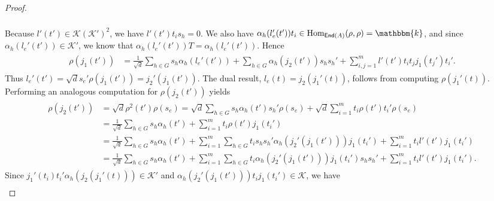 \begin{proof}
\begin{align*}
\begin{split}
\end{split}
\end{align*}
\noindent Because $l'(t') \in \mathcal{K}(\mathcal{K}')^2$, we have $l'(t')t_is_h = 0$. We also have $\alpha_h(l_e'(t'))t_i \in \homset_{\textcat{End}(A)}(\rho, \rho) = \mathbbm{k}$, and since $\alpha_h(l_e'(t')) \in \mathcal{K}'$, we know that $\alpha_h(l_e'(t'))T = \alpha_h(l_e'(t'))$. Hence
\begin{align*}
\begin{split}
\rho(j_1(t')) &= \frac{1}{\sqrt{d}}\sum_{h \in G} s_h\alpha_h(l_e'(t')) + \sum_{h \in G} \alpha_h(j_2(t'))s_hs_h' + \sum_{i,j=1}^m l'(t')t_it_j j_1(t_j')t_i'.
\end{split}
\end{align*}
\noindent Thus $l_e'(t') = \sqrt{d}s_e'\rho(j_1(t')) = j_2'(j_1(t'))$. The dual result, $l_e(t) = j_2(j_1'(t))$, follows from computing $\rho(j_1'(t))$. Performing an analogous computation for $\rho(j_2(t'))$ yields
\begin{align*}
\begin{split}
\rho(j_2(t')) &= \sqrt{d}\rho^2(t')\rho(s_e) = \sqrt{d}\sum_{h \in G}s_h\alpha_h(t')s_h'\rho(s_e) + \sqrt{d}\sum_{i=1}^m t_i\rho(t')t_i'\rho(s_e)\\
&= \frac{1}{\sqrt{d}}\sum_{h \in G}s_h\alpha_h(t') + \sum_{i=1}^m t_i\rho(t') j_1(t_i')\\
&= \frac{1}{\sqrt{d}}\sum_{h \in G}s_h\alpha_h(t') + \sum_{i=1}^m\sum_{h \in G} t_i s_hs_h'\alpha_h(j_2'(j_1(t')))j_1(t_i') + \sum_{i=1}^m t_i l'(t') j_1(t_i')\\
&= \frac{1}{\sqrt{d}}\sum_{h \in G}s_h\alpha_h(t') + \sum_{i=1}^m\sum_{h \in G} t_i\alpha_h(j_2'(j_1(t')))j_1(t_i') s_hs_h' + \sum_{i=1}^m t_i l'(t') j_1(t_i').
\end{split}
\end{align*}
\noindent Since $j_1'(t_i)t_i'\alpha_h(j_2(j_1'(t))) \in \mathcal{K}'$ and $\alpha_h(j_2'(j_1(t')))t_ij_1(t_i') \in \mathcal{K}$, we have
\begin{align*}

\end{align*}
\end{proof}
